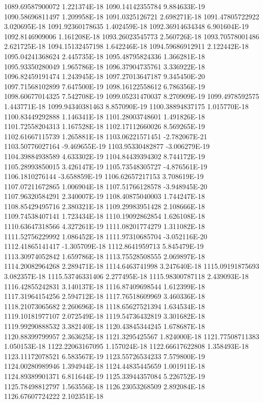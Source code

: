 1089.69587900072  1.221374E-18
1090.14142355784  9.884633E-19
1090.58696811497  1.209958E-18
1091.0325126721  2.698271E-18
1091.47805722922  3.020695E-18
1091.92360178635  1.402459E-18
1092.36914634348  6.901604E-19
1092.8146909006  1.161208E-18
1093.26023545773  2.560726E-18
1093.70578001486  2.621725E-18
1094.15132457198  1.642246E-18
1094.59686912911  2.122442E-18
1095.04241368624  2.445735E-18
1095.48795824336  1.366281E-18
1095.93350280049  1.965786E-18
1096.37904735761  3.336922E-18
1096.82459191474  1.243945E-18
1097.27013647187  9.345450E-20
1097.71568102899  7.647500E-19
1098.16122558612  6.786356E-19
1098.60677014325  7.542708E-19
1099.05231470037  8.270909E-19
1099.4978592575  1.443771E-18
1099.94340381463  8.857090E-19
1100.38894837175  1.015770E-18
1100.83449292888  1.146341E-18
1101.28003748601  1.491826E-18
1101.72558204313  1.167528E-18
1102.17112660026  8.569265E-19
1102.61667115739  1.265881E-18
1103.06221571451  -2.782067E-21
1103.50776027164  -9.469655E-19
1103.95330482877  -3.006279E-19
1104.39884938589  4.633302E-19
1104.84439394302  8.744172E-19
1105.28993850015  3.426147E-19
1105.73548305727  -4.876561E-19
1106.1810276144  -3.658859E-19
1106.62657217153  3.708619E-19
1107.07211672865  1.006904E-18
1107.51766128578  -3.948945E-20
1107.96320584291  2.340007E-19
1108.40875040003  1.744247E-18
1108.85429495716  2.380321E-18
1109.29983951428  2.108666E-18
1109.74538407141  1.723434E-18
1110.19092862854  1.626108E-18
1110.63647318566  4.327261E-19
1111.08201774279  1.311082E-18
1111.52756229992  1.086452E-18
1111.97310685704  -3.052116E-20
1112.41865141417  -1.305709E-18
1112.8641959713  5.845479E-19
1113.30974052842  1.659786E-18
1113.75528508555  2.069897E-18
1114.20082964268  2.289471E-18
1114.6463741998  3.247640E-18
1115.09191875693  3.082357E-18
1115.53746331406  2.277495E-18
1115.98300787118  2.439093E-18
1116.42855242831  3.140137E-18
1116.87409698544  1.612399E-18
1117.31964154256  2.594712E-18
1117.76518609969  3.460336E-18
1118.21073065682  2.260696E-18
1118.65627521394  1.634534E-18
1119.10181977107  2.072549E-18
1119.54736432819  3.301682E-18
1119.99290888532  3.382140E-18
1120.43845344245  1.678687E-18
1120.88399799957  2.363625E-18
1121.3295425567  1.824000E-18
1121.77508711383  1.050153E-18
1122.22063167095  1.157024E-18
1122.66617622808  1.358493E-18
1123.11172078521  6.583567E-19
1123.55726534233  7.579800E-19
1124.00280989946  1.394944E-18
1124.44835445659  1.001911E-18
1124.89389901371  6.811644E-19
1125.33944357084  5.226752E-19
1125.78498812797  1.563556E-18
1126.23053268509  2.892084E-18
1126.67607724222  2.102351E-18
